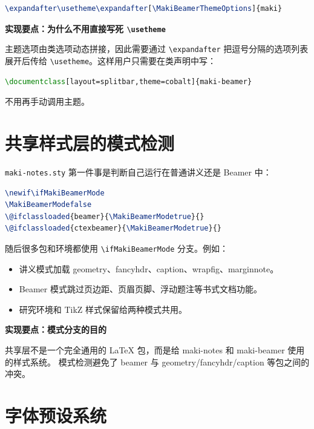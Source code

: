 \documentclass[a4paper,11pt]{ltxdoc}
\newcommand{\mfile}[1]{\texttt{#1}}
\newcommand{\mcls}[1]{\textsf{#1}}
\newcommand{\mpkg}[1]{\textsf{#1}}
\newcommand{\mcmd}[1]{\texttt{\textbackslash#1}}
\newenvironment{implementation}[1]
  {\par\medskip\noindent\textbf{\color{MakiBlue}实现要点：#1}\par\smallskip}
  {\par\medskip}
\begin{document}
\begin{lstlisting}[language=TeX]
\expandafter\usetheme\expandafter[\MakiBeamerThemeOptions]{maki}
\end{lstlisting}

\begin{implementation}{为什么不用直接写死 \mcmd{usetheme}}
主题选项由类选项动态拼接，因此需要通过 \mcmd{expandafter} 把逗号分隔的选项列表展开后传给
\mcmd{usetheme}。这样用户只需要在类声明中写：
\begin{lstlisting}[language=TeX]
\documentclass[layout=splitbar,theme=cobalt]{maki-beamer}
\end{lstlisting}
不用再手动调用主题。
\end{implementation}

\section{共享样式层的模式检测}

\mfile{maki-notes.sty} 第一件事是判断自己运行在普通讲义还是 Beamer 中：

\begin{lstlisting}[language=TeX]
\newif\ifMakiBeamerMode
\MakiBeamerModefalse
\@ifclassloaded{beamer}{\MakiBeamerModetrue}{}
\@ifclassloaded{ctexbeamer}{\MakiBeamerModetrue}{}
\end{lstlisting}

随后很多包和环境都使用 \mcmd{ifMakiBeamerMode} 分支。例如：

\begin{itemize}
\item 讲义模式加载 \mpkg{geometry}、\mpkg{fancyhdr}、\mpkg{caption}、\mpkg{wrapfig}、\mpkg{marginnote}。
\item Beamer 模式跳过页边距、页眉页脚、浮动题注等书式文档功能。
\item 研究环境和 TikZ 样式保留给两种模式共用。
\end{itemize}

\begin{implementation}{模式分支的目的}
共享层不是一个完全通用的 LaTeX 包，而是给 \mcls{maki-notes} 和 \mcls{maki-beamer} 使用的样式系统。
模式检测避免了 \mcls{beamer} 与 \mpkg{geometry}/\mpkg{fancyhdr}/\mpkg{caption} 等包之间的冲突。
\end{implementation}

\section{字体预设系统}
\end{document}
